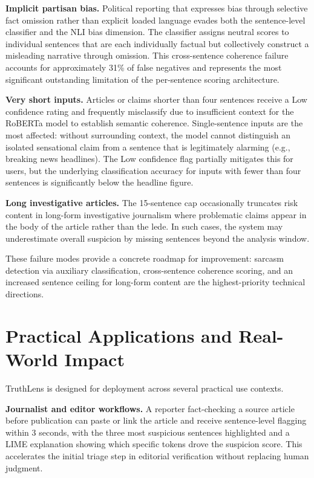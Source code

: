 \documentclass[journal]{IEEEtran}
\begin{document}
\textbf{Implicit partisan bias.} Political reporting that expresses bias through selective
fact omission rather than explicit loaded language evades both the sentence-level classifier
and the NLI bias dimension. The classifier assigns neutral scores to individual sentences
that are each individually factual but collectively construct a misleading narrative through
omission. This cross-sentence coherence failure accounts for approximately 31\% of false
negatives and represents the most significant outstanding limitation of the per-sentence
scoring architecture.

\textbf{Very short inputs.} Articles or claims shorter than four sentences receive a Low
confidence rating and frequently misclassify due to insufficient context for the RoBERTa
model to establish semantic coherence. Single-sentence inputs are the most affected:
without surrounding context, the model cannot distinguish an isolated sensational claim
from a sentence that is legitimately alarming (e.g., breaking news headlines). The Low
confidence flag partially mitigates this for users, but the underlying classification
accuracy for inputs with fewer than four sentences is significantly below the headline
figure.

\textbf{Long investigative articles.} The 15-sentence cap occasionally truncates risk
content in long-form investigative journalism where problematic claims appear in the body
of the article rather than the lede. In such cases, the system may underestimate overall
suspicion by missing sentences beyond the analysis window.

These failure modes provide a concrete roadmap for improvement: sarcasm detection via
auxiliary classification, cross-sentence coherence scoring, and an increased sentence
ceiling for long-form content are the highest-priority technical directions.

\section{Practical Applications and Real-World Impact}
\label{sec:impact}

TruthLens is designed for deployment across several practical use contexts.

\textbf{Journalist and editor workflows.} A reporter fact-checking a source article before
publication can paste or link the article and receive sentence-level flagging within 3
seconds, with the three most suspicious sentences highlighted and a LIME explanation showing
which specific tokens drove the suspicion score. This accelerates the initial triage step in
editorial verification without replacing human judgment.
\end{document}
